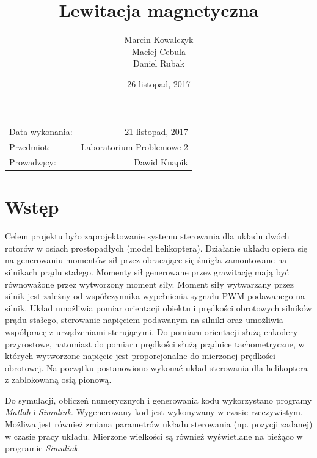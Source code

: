 \documentclass[11pt,a4paper]{article}
\title{\textbf{Lewitacja magnetyczna}} %
\author{Marcin Kowalczyk \\ Maciej Cebula \\ Daniel Rubak} %
\date{26 listopad, 2017} %
\begin{document}
\maketitle %

\begin{center}
\begin{tabular}{l r}
Data wykonania: & 21 listopad, 2017 \\ %
Przedmiot: & Laboratorium Problemowe 2 \\
Prowadzący: & Dawid Knapik %
\end{tabular}
\end{center}

\section{Wstęp}
\label{sec:wstep}
Celem projektu było zaprojektowanie systemu sterowania dla układu dwóch rotorów w osiach prostopadłych (model helikoptera). Działanie układu opiera się na generowaniu momentów sił przez obracające się śmigła zamontowane na silnikach prądu stałego. Momenty sił generowane przez grawitację mają być równoważone przez wytworzony moment siły. Moment siły wytwarzany przez silnik jest zależny od współczynnika wypełnienia sygnału PWM podawanego na silnik. Układ umożliwia pomiar orientacji obiektu i prędkości obrotowych silników prądu stałego, sterowanie napięciem podawanym na silniki oraz umożliwia współpracę z urządzeniami sterującymi. Do pomiaru orientacji służą enkodery przyrostowe, natomiast do pomiaru prędkości służą prądnice tachometryczne, w których wytworzone napięcie jest proporcjonalne do mierzonej prędkości obrotowej. Na początku postanowiono wykonać układ sterowania dla helikoptera z zablokowaną osią pionową.

Do symulacji, obliczeń numerycznych i generowania kodu wykorzystano programy \textit{Matlab} i \textit{Simulink}. Wygenerowany kod jest wykonywany w czasie rzeczywistym. Możliwa jest również zmiana parametrów układu sterowania (np. pozycji zadanej) w czasie pracy układu. Mierzone wielkości są również wyświetlane na bieżąco w programie \textit{Simulink}.
\end{document}
